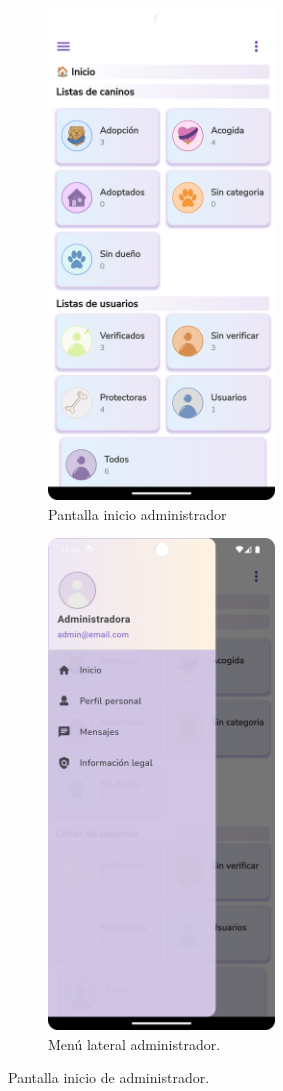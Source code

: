 \documentclass[a4paper, 12pt]{article}
\begin{document}
\begin{figure}[H]
   	\begin{subfigure}{0.48\textwidth}
		\begin{center}
			{\includegraphics[width=6cm]{app/AdminHome.png}\par}
			\caption{Pantalla inicio administrador}
		\end{center}
	\end{subfigure}\hfill
   	\begin{subfigure}{0.48\textwidth}
		\begin{center}
			{\includegraphics[width=6cm]{app/AdminDrawer.png}\par}
			\caption{Menú lateral administrador.}
		\end{center}
	\end{subfigure}\hfill
	\caption{Pantalla inicio de administrador.}
\end{figure}
\end{document}
